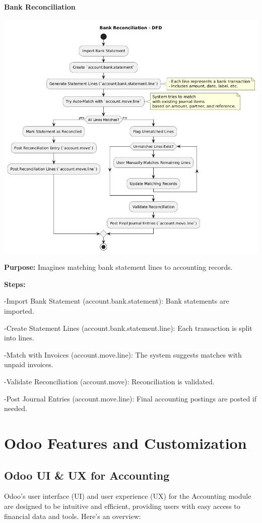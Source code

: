 \documentclass[11pt,a4paper]{article}
\begin{document}
\newpage
\noindent\textbf{Bank Reconciliation}
\medskip

\begin{center}
    \includegraphics[width=0.8\linewidth]{diagram/bankreconciliation-DFD.png}
\end{center}

\noindent\textbf{Purpose:} Imagines matching bank statement lines to accounting records.
\medskip

\noindent\textbf{Steps:}

\noindent -Import Bank Statement (account.bank.statement): Bank statements are imported.

\noindent -Create Statement Lines (account.bank.statement.line): Each transaction is split into lines.

\noindent -Match with Invoices (account.move.line): The system suggests matches with unpaid invoices.

\noindent -Validate Reconciliation (account.move): Reconciliation is validated.

\noindent -Post Journal Entries (account.move.line): Final accounting postings are posted if needed.

\newpage
\section{Odoo Features and Customization}
\subsection{Odoo UI \& UX for Accounting}

Odoo's user interface (UI) and user experience (UX) for the Accounting module are designed to 
be intuitive and efficient, providing users with easy access to financial data and tools. Here's an 
overview:
\medskip
\end{document}
